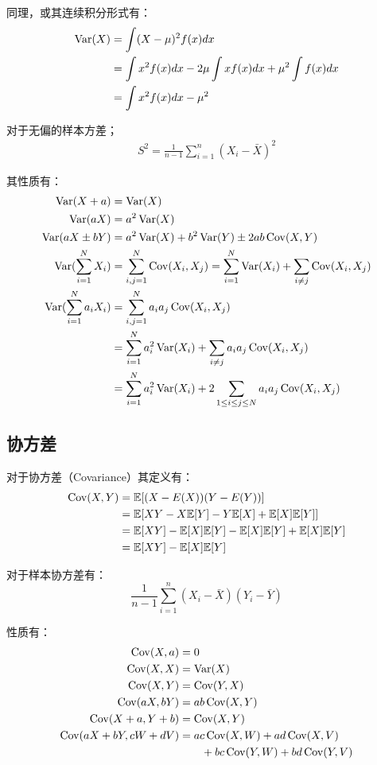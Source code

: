 \documentclass[11pt]{article}
\begin{document}
同理，或其连续积分形式有：
\begin{align*}
    \operatorname{Var}(X) &= \int (X-\mu)^2 f(x) dx \\
    &= \int x^2 f(x) dx - 2\mu \int xf(x)dx + \mu^2 \int f(x)dx \\
    &= \int x^2 f(x) dx - \mu^2
\end{align*}

对于无偏的样本方差；
\begin{align*}
    S^2 = \frac{1}{n-1} \sum_{i=1}^{n} \left(X_i - \bar{X} \right)^2
\end{align*}

其性质有：
\begin{align*}
    \operatorname{Var}(X + a) &= \operatorname{Var}(X) \\
    \operatorname{Var}(aX) &= a^2\operatorname{Var}(X) \\
    \operatorname{Var}(aX \pm bY) &= a^2\operatorname{Var}(X) + b^2\operatorname{Var}(Y) \pm 2ab \operatorname{Cov}(X,Y) \\
    \operatorname{Var}(\sum_{i=1}^{N} X_i) &= \sum_{i,j=1}^{N}\operatorname{Cov}(X_i,X_j) = \sum_{i=1}^{N}\operatorname{Var}(X_i) + \sum_{i \neq j}\operatorname{Cov}(X_i,X_j) \\
    \operatorname{Var}(\sum_{i=1}^{N} a_i X_i) &= \sum_{i,j=1}^{N}a_i a_j\operatorname{Cov}(X_i,X_j) \\
    &= \sum_{i=1}^{N}a_i^2\operatorname{Var}(X_i) + \sum_{i \neq j} a_i a_j \operatorname{Cov}(X_i,X_j) \\
    &= \sum_{i=1}^{N}a_i^2\operatorname{Var}(X_i) + 2\sum_{1 \leq i \leq j \leq N} a_i a_j \operatorname{Cov}(X_i,X_j)
\end{align*}

\subsection{协方差}

对于协方差（Covariance）其定义有：
\begin{align*}
    \operatorname{Cov}(X,Y) &= \mathbb{E}[(X-E(X))(Y-E(Y))] \\
    &= \mathbb{E}[XY - X\mathbb{E}[Y] -Y\mathbb{E}[X]+ \mathbb{E}[X]\mathbb{E}[Y]] \\
    &= \mathbb{E}[XY] - \mathbb{E}[X]\mathbb{E}[Y] - \mathbb{E}[X]\mathbb{E}[Y] + \mathbb{E}[X]\mathbb{E}[Y] \\
    &= \mathbb{E}[XY] - \mathbb{E}[X]\mathbb{E}[Y]
\end{align*}

对于样本协方差有：
\begin{equation*}
    \frac{1}{n-1} \sum_{i=1}^{n} \left(X_i - \bar{X} \right) \left(Y_i - \bar{Y} \right)
\end{equation*}

性质有：
\begin{align*}
    \operatorname{Cov}(X,a) &= 0 \\
    \operatorname{Cov}(X,X) &= \operatorname{Var}(X) \\
    \operatorname{Cov}(X,Y) &= \operatorname{Cov}(Y,X) \\
    \operatorname{Cov}(aX,bY) &= ab\operatorname{Cov}(X,Y) \\
    \operatorname{Cov}(X+a,Y+b) &= \operatorname{Cov}(X,Y) \\
    \operatorname{Cov}(aX+bY,cW+dV) &= ac\operatorname{Cov}(X,W)+ad\operatorname{Cov}(X,V) \\
    &\hspace{2em} +bc\operatorname{Cov}(Y,W)+bd\operatorname{Cov}(Y,V)
\end{align*}
\end{document}
